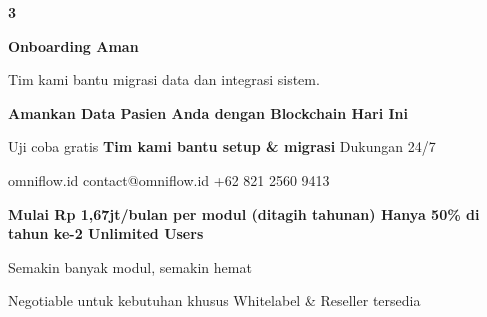 \documentclass[a4paper]{article}
\begin{document}
\begin{center}
\begin{minipage}[t]{0.318\textwidth}
{\begin{minipage}[t][4.7cm][c]{\dimexpr\linewidth-2\fboxsep\relax}
            \begin{center}
                {\fontsize{22}{26}\selectfont\bfseries\color{BluePrimary} 3}
            \end{center}
            \vspace{2pt}
            \begin{center}
                {\fontsize{10}{13}\selectfont\bfseries\color{BlueDark} Onboarding Aman}\par\vspace{3pt}
                {\fontsize{9}{12}\selectfont\color{TextDark} Tim kami bantu migrasi data dan integrasi sistem.}
            \end{center}
        \end{minipage}}
\end{minipage}
\end{center}

\vspace{8pt}

{\setlength{\fboxsep}{10pt}\setlength{\fboxrule}{0pt}%
\noindent\colorbox{BluePrimary}{%
    \begin{minipage}{\dimexpr\textwidth-2\fboxsep\relax}
        \centering
        {\fontsize{13}{16}\selectfont\bfseries\color{White}
        Amankan Data Pasien Anda dengan Blockchain Hari Ini}\par\vspace{3pt}
        {\fontsize{9.5}{12}\selectfont\color{BlueMid}
        Uji coba gratis \enspace\textbullet\enspace \textbf{Tim kami bantu setup \& migrasi} \enspace\textbullet\enspace Dukungan 24/7}\par\vspace{2pt}
        {\fontsize{9.5}{12}\selectfont\color{BlueLight}
        omniflow.id \enspace\textbullet\enspace contact@omniflow.id \enspace\textbullet\enspace +62 821 2560 9413}
    \end{minipage}}}


\vspace{6pt}

{\setlength{\fboxsep}{8pt}\setlength{\fboxrule}{0pt}%
\noindent\colorbox{BlueBg}{%
    \begin{minipage}{\dimexpr\textwidth-2\fboxsep\relax}
        \centering
        {\fontsize{9}{12}\selectfont\bfseries\color{BluePrimary}
        Mulai Rp 1,67jt/bulan per modul (ditagih tahunan) \enspace\textbullet\enspace Hanya 50\% di tahun ke-2 \enspace\textbullet\enspace Unlimited Users}\par\vspace{1pt}
        {\fontsize{8.5}{11}\selectfont\color{BlueDark}
        Semakin banyak modul, semakin hemat}\par\vspace{1pt}
        {\fontsize{8}{10}\selectfont\color{TextLight}
        Negotiable untuk kebutuhan khusus \enspace\textbullet\enspace Whitelabel \& Reseller tersedia}
    \end{minipage}}}

\restoregeometry
\pagestyle{empty}
\end{document}
